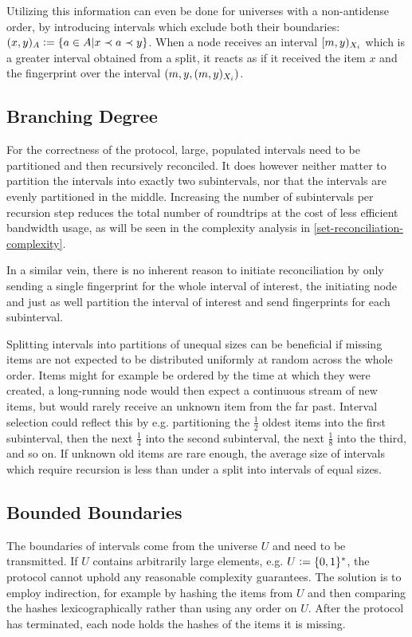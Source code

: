 Utilizing this information can even be done for universes with a non-antidense order, by introducing intervals which exclude both their boundaries: $({x},{y})_{A} \vcentcolon= \{a \in A | x \prec a \prec y\}$. When a node receives an interval $[{m},{y})_{X_i}$ which is a greater interval obtained from a split, it reacts as if it received the item $x$ and the fingerprint over the interval $({m}, {y}, {({m},{y})_{X_i}})$.

\subsection{Branching Degree}

For the correctness of the protocol, large, populated intervals need to be partitioned and then recursively reconciled. It does however neither matter to partition the intervals into exactly two subintervals, nor that the intervals are evenly partitioned in the middle. Increasing the number of subintervals per recursion step reduces the total number of roundtrips at the cost of less efficient bandwidth usage, as will be seen in the complexity analysis in \cref{set-reconciliation-complexity}.

In a similar vein, there is no inherent reason to initiate reconciliation by only sending a single fingerprint for the whole interval of interest, the initiating node and just as well partition the interval of interest and send fingerprints for each subinterval.

Splitting intervals into partitions of unequal sizes can be beneficial if missing items are not expected to be distributed uniformly at random across the whole order. Items might for example be ordered by the time at which they were created, a long-running node would then expect a continuous stream of new items, but would rarely receive an unknown item from the far past. Interval selection could reflect this by e.g. partitioning the $\frac{1}{2}$ oldest items into the first subinterval, then the next $\frac{1}{4}$ into the second subinterval, the next $\frac{1}{8}$ into the third, and so on. If unknown old items are rare enough, the average size of intervals which require recursion is less than under a split into intervals of equal sizes.

\subsection{Bounded Boundaries}

The boundaries of intervals come from the universe $U$ and need to be transmitted. If $U$ contains arbitrarily large elements, e.g. $U \vcentcolon= \{0, 1\}^{\ast}$, the protocol cannot uphold any reasonable complexity guarantees. The solution is to employ indirection, for example by hashing the items from $U$ and then comparing the hashes lexicographically rather than using any order on $U$. After the protocol has terminated, each node holds the hashes of the items it is missing.

